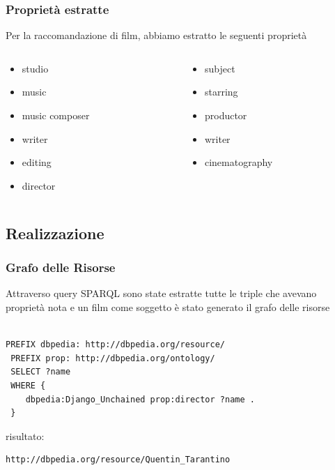 \documentclass{beamer}
\begin{document}

\begin{frame}
\frametitle{Proprietà estratte}
Per la raccomandazione di film, abbiamo estratto le seguenti proprietà
\begin{columns}
\begin{column}{0.5\textwidth}
\begin{itemize}
\item studio
\item music
\item music composer
\item writer
\item editing
\item director
\end{itemize}
\end{column}
\begin{column}{0.5\textwidth}
\begin{itemize}
\item subject
\item starring
\item productor
\item writer
\item cinematography
\end{itemize}
\end{column}
\end{columns}
\end{frame}


\subsection{Realizzazione}


\begin{frame}[fragile]
\frametitle{Grafo delle Risorse}
Attraverso query SPARQL sono state estratte tutte le triple che avevano proprietà nota e un film come soggetto
è stato generato il grafo delle risorse \\~\\
\begin{lstlisting}[language=customized]
 PREFIX dbpedia: http://dbpedia.org/resource/
 PREFIX prop: http://dbpedia.org/ontology/
 SELECT ?name
 WHERE {
    dbpedia:Django_Unchained prop:director ?name .
 }
\end{lstlisting}
risultato:

\begin{lstlisting}[language=customized]
  http://dbpedia.org/resource/Quentin_Tarantino
\end{lstlisting}
\end{frame}
\end{document}
